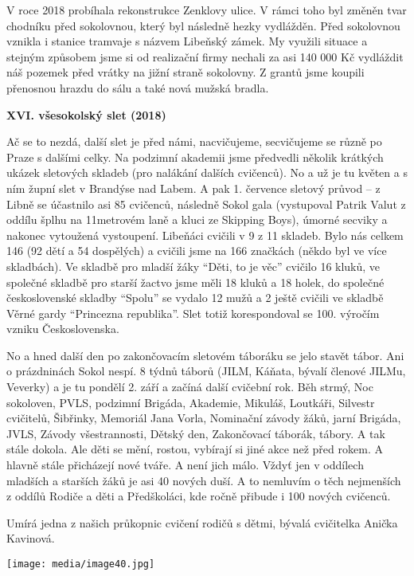 V roce 2018 probíhala rekonstrukce Zenklovy ulice. V rámci toho byl
změněn tvar chodníku před sokolovnou, který byl následně hezky
vydlážděn. Před sokolovnou vznikla i stanice tramvaje s názvem Libeňský
zámek. My využili situace a stejným způsobem jsme si od realizační firmy
nechali za asi 140 000 Kč vydláždit náš pozemek před vrátky na jižní
straně sokolovny. Z grantů jsme koupili přenosnou hrazdu do sálu a také
nová mužská bradla.

\textbf{XVI. všesokolský slet (2018)}

Ač se to nezdá, další slet je před námi, nacvičujeme, secvičujeme se
různě po Praze s dalšími celky. Na podzimní akademii jsme předvedli
několik krátkých ukázek sletových skladeb (pro nalákání dalších
cvičenců). No a už je tu květen a s ním župní slet v Brandýse nad Labem.
A pak 1. července sletový průvod -- z Libně se účastnilo asi 85
cvičenců, následně Sokol gala (vystupoval Patrik Valut z oddílu šplhu na
11metrovém laně a kluci ze Skipping Boys), úmorné secviky a nakonec
vytoužená vystoupení. Libeňáci cvičili v 9 z 11 skladeb. Bylo nás celkem
146 (92 dětí a 54 dospělých) a cvičili jsme na 166 značkách (někdo byl
ve více skladbách). Ve skladbě pro mladší žáky ``Děti, to je věc''
cvičilo 16 kluků, ve společné skladbě pro starší žactvo jsme měli 18
kluků a 18 holek, do společné československé skladby ``Spolu'' se vydalo
12 mužů a 2 ještě cvičili ve skladbě Věrné gardy ``Princezna
republika''. Slet totiž korespondoval se 100. výročím vzniku
Československa.

No a hned další den po zakončovacím sletovém táboráku se jelo stavět
tábor. Ani o prázdninách Sokol nespí. 8 týdnů táborů (JILM, Káňata,
bývalí členové JILMu, Veverky) a je tu pondělí 2. září a začíná další
cvičební rok. Běh strmý, Noc sokoloven, PVLS, podzimní Brigáda,
Akademie, Mikuláš, Loutkáři, Silvestr cvičitelů, Šibřinky, Memoriál Jana
Vorla, Nominační závody žáků, jarní Brigáda, JVLS, Závody všestrannosti,
Dětský den, Zakončovací táborák, tábory. A tak stále dokola. Ale děti se
mění, rostou, vybírají si jiné akce než před rokem. A hlavně stále
přicházejí nové tváře. A není jich málo. Vždyť jen v oddílech mladších a
starších žáků je asi 40 nových duší. A to nemluvím o těch nejmenších z
oddílů Rodiče a děti a Předškoláci, kde ročně přibude i 100 nových
cvičenců.

Umírá jedna z našich průkopnic cvičení rodičů s dětmi, bývalá cvičitelka
Anička Kavinová.

\texttt{[image: media/image40.jpg]}

